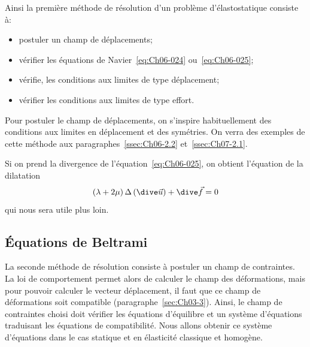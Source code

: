 Ainsi la première méthode de résolution d'un problème d'élastostatique consiste à: 
\begin{itemize}
    \item postuler un champ de déplacements;
    \item vérifier les équations de Navier~\eqref{eq:Ch06-024} ou~\eqref{eq:Ch06-025};
    \item vérifie, les conditions aux limites de type déplacement;
    \item vérifier les conditions aux limites de type effort.
\end{itemize}
Pour postuler le champ de déplacements, on s'inspire habituellement des conditions aux limites en déplacement et des symétries.
On verra des exemples de cette méthode aux paragraphes~\ref{ssec:Ch06-2.2} et~\ref{ssec:Ch07-2.1}. 

Si on prend la divergence de l'équation~\eqref{eq:Ch06-025}, on obtient l'équation de la dilatation
\begin{equation}
    \left( \lambda + 2 \mu \right) \Delta \left( \dive \vec{u} \right) + \dive \vec{f} = 0
    \label{eq:Ch06-026}
\end{equation}
qui nous sera utile plus loin.

\subsection{Équations de Beltrami} \label{ssec:Ch06-1.4}
La seconde méthode de résolution consiste à postuler un champ de contraintes.
La loi de comportement permet alors de calculer le champ des déformations, mais pour pouvoir calculer le vecteur déplacement, il faut que ce champ de déformations soit compatible (paragraphe~\ref{sec:Ch03-3}).
Ainsi, le champ de contraintes choisi doit vérifier les équations d'équilibre et un système d'équations traduisant les équations de compatibilité.
Nous allons obtenir ce système d'équations dans le cas statique et en élasticité classique et homogène.

